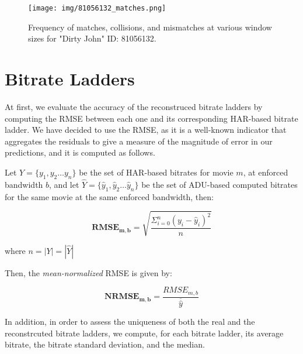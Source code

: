 \begin{figure}[!h]
  \centering
  \texttt{[image: img/81056132\_matches.png]}
  \caption{Frequency of matches, collisions, and mismatches  at various window
  sizes for "Dirty John" ID: 81056132.}
  \label{fig:fingerprints}
\end{figure}

\section{Bitrate Ladders}

At first, we evaluate the accuracy of the reconstruced bitrate ladders by
computing the RMSE between each one and its corresponding HAR-based bitrate
ladder. We have decided to use the RMSE, as it is a well-known indicator that
aggregates the residuals to give a measure of the magnitude of error in our
predictions, and it is computed as follows.

Let $Y=\{y_1, y_2 \dots y_n\}$ be the set of HAR-based bitrates for movie $m$,
at enforced bandwidth $b$, and let $\hat{Y}=\{\hat{y}_1, \hat{y}_2 \dots
\hat{y}_n\}$ be the set of ADU-based computed bitrates for the same movie at
the same enforced bandwidth, then:

\begin{equation*}
    \mathbf{RMSE_{m, b}} = \sqrt{\dfrac{\Sigma_{i=0}^{n}(y_i - \hat{y}_i)^2}{n}}
\end{equation*}

where $n = |Y| = |\hat{Y}|$

Then, the \emph{mean-normalized} RMSE is given by:

\begin{equation*}
    \mathbf{NRMSE_{m, b}} = \dfrac{RMSE_{m, b}}{\overline{\hat{y}}}
\end{equation*}

In addition, in order to assess the uniqueness of both the real and the
reconstrcuted bitrate ladders, we compute, for each bitrate ladder, its average
bitrate, the bitrate standard deviation, and the median.

